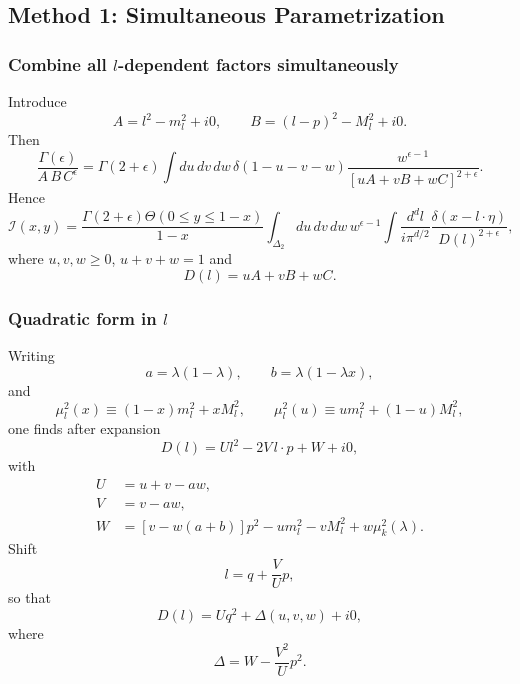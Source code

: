 \documentclass[11pt]{article}
\begin{document}
\subsection{Method 1: Simultaneous Parametrization}

\subsubsection{Combine all $l$-dependent factors simultaneously}
Introduce
\begin{equation}
A=l^2-m_l^2+i0,\qquad B=(l-p)^2-M_l^2+i0.
\label{eq:method1-A-B-def}
\end{equation}
Then
\begin{equation}
\frac{\Gamma(\epsilon)}{A\,B\,C^{\epsilon}}=
\Gamma(2+\epsilon)\int du\,dv\,dw\,\delta(1-u-v-w)
\frac{w^{\epsilon-1}}{[uA+vB+wC]^{2+\epsilon}}.
\label{eq:method1-feynman-param}
\end{equation}
Hence
\begin{equation}
\mathcal I(x,y)=
\frac{\Gamma(2+\epsilon)\Theta(0\le y\le 1-x)}{1-x}
\int_{\Delta_2}du\,dv\,dw\,w^{\epsilon-1}
\int\frac{d^d l}{i\pi^{d/2}}
\frac{\delta(x-l\cdot\eta)}{D(l)^{2+\epsilon}},
\label{eq:method1-parametric-before-l}
\end{equation}
where $u,v,w\ge0$, $u+v+w=1$ and
\begin{equation}
D(l)=uA+vB+wC.
\label{eq:method1-D-def}
\end{equation}

\subsubsection{Quadratic form in $l$}
Writing
\begin{equation}
a=\lambda(1-\lambda),\qquad b=\lambda(1-\lambda x),
\label{eq:method1-a-b-def}
\end{equation}
and
\begin{equation}
\mu_l^2(x)\equiv (1-x)m_l^2+xM_l^2,
\qquad
\mu_l^2(u)\equiv u m_l^2+(1-u)M_l^2,
\label{eq:mu-l-def}
\end{equation}
one finds after expansion
\begin{equation}
D(l)=U l^2-2V\,l\cdot p+W+i0,
\label{eq:method1-quadratic-form}
\end{equation}
with
\begin{align}
U&=u+v-aw,\\
V&=v-aw,\\
W&=[v-w(a+b)]p^2-u m_l^2-v M_l^2+w\mu_k^2(\lambda).
\label{eq:method1-UVW-def}
\end{align}
Shift
\[
l=q+\frac{V}{U}p,
\]
so that
\begin{equation}
D(l)=U q^2+\Delta(u,v,w)+i0,
\label{eq:method1-shifted-denominator}
\end{equation}
where
\begin{equation}
\Delta=W-\frac{V^2}{U}p^2.
\label{eq:method1-Delta-def}
\end{equation}
\end{document}
